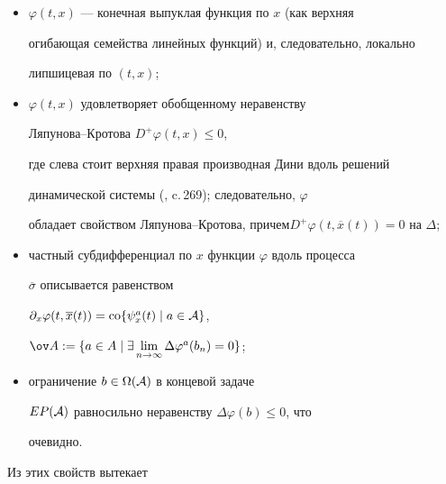 \begin{itemize}


\item[1)] $\varphi (t,x)$ --- конечная выпуклая функция по $x$ (как верхняя


огибающая семейства линейных функций) и, следовательно, локально


липшицевая по $(t,x)$;


\item[2)] $\varphi (t,x)$ удовлетворяет обобщенному неравенству


Ляпунова--Кротова $D^+ \varphi (t,x)\leq 0$,


где слева стоит верхняя правая производная Дини вдоль решений


динамической системы (\cite{14}, c.\,269); следовательно, $\varphi$


обладает свойством Ляпунова--Кротова, причем\linebreak $D^+ \varphi


(t,\overline{x}(t))=0$ на $\Delta$;


\item[3)] частный субдифференциал по $x$ функции $\varphi$ вдоль процесса


$\overline{\sigma}$ описывается равенством


$\partial_x \varphi (t, \overline{x}(t))=\co\{\psi_x^a


(t)\mid a\in {\cal A}\}$,


$\ov A:=\{a\in A\mid\exists\lim\limits_{n\to\infty}\Delta\varphi^a(b_n)=0\}$;


\item[4)] ограничение $b\in \Omega ({\cal A})$ в концевой задаче


$EP({\cal A})$ равносильно неравенству $\Delta \varphi (b)\leq 0$, что


очевидно.


\end{itemize}





Из этих свойств вытекает





